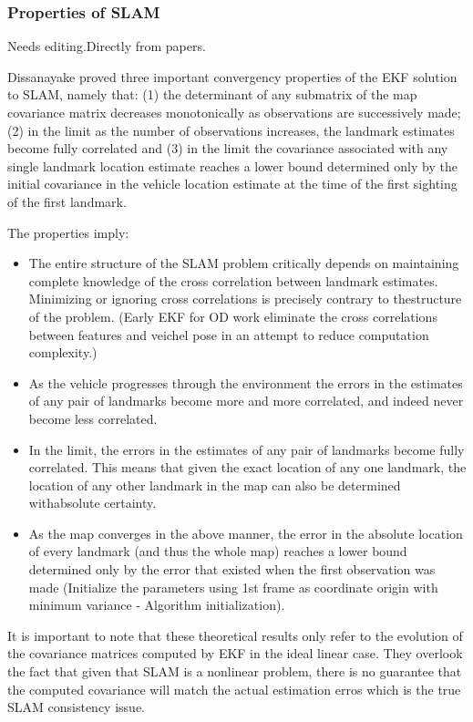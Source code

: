 \subsubsection{Properties of SLAM}
\label{sec:SLAM_properties}

Needs editing.Directly from papers.

Dissanayake proved three important convergency properties of the EKF 
solution to SLAM, namely that: (1) the determinant of any submatrix of 
the map covariance matrix decreases monotonically as observations are 
successively made; (2) in the limit as the number of observations 
increases, the landmark estimates become fully correlated and (3) in the 
limit the covariance associated with any single landmark location 
estimate reaches a lower bound determined only by the initial covariance 
in the vehicle location estimate at the time of the first sighting of 
the first landmark.

The properties imply:

\begin{itemize}
  \item The entire structure of the SLAM problem critically depends on 
  maintaining complete knowledge of the cross correlation between landmark 
  estimates. Minimizing or ignoring cross correlations is precisely 
  contrary to thestructure of the problem. (Early EKF for OD work 
  eliminate the cross correlations between features and veichel pose in an 
  attempt to reduce computation complexity.)
  \item As the vehicle progresses through the environment the errors in 
  the estimates of any pair of landmarks become more and more correlated, 
  and indeed never become less correlated.
  \item In the limit, the errors in the estimates of any pair of landmarks 
  become fully correlated. This means that given the exact location of any 
  one landmark, the location of any other landmark in the map can also be 
  determined withabsolute certainty.
  \item As the map converges in the above manner, the error in the 
  absolute location of every landmark (and thus the whole map) reaches a 
  lower bound determined only by the error that existed when the first 
  observation was made (Initialize the parameters using 1st frame as 
  coordinate origin with minimum variance - Algorithm initialization).
\end{itemize}
It is important to note that these theoretical results only refer to the 
evolution of the covariance matrices computed by EKF in the ideal linear 
case. They overlook the fact that given that SLAM is a nonlinear 
problem, there is no guarantee that the computed covariance will match 
the actual estimation erros which is the true SLAM consistency issue. 

